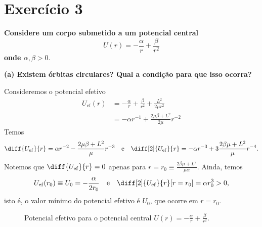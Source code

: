 \section*{Exercício 3}
\textbf{Considere um corpo submetido a um potencial central
    \begin{equation*}
        U(r) = -\frac{\alpha}{r} + \frac{\beta}{r^2}
    \end{equation*}
onde \(\alpha,\beta>0.\)}

\textbf{(a) Existem órbitas circulares? Qual a condição para que isso ocorra?}

Consideremos o potencial efetivo
\begin{align}
    U_\mathrm{ef}(r) &= -\frac{\alpha}{r} + \frac{\beta}{r^2} + \frac{L^2}{2\mu r^2}\\
                     &= -\alpha r^{-1} + \frac{2\mu\beta + L^2}{2\mu}r^{-2}
\end{align}
Temos
\begin{equation}
    \diff{U_\mathrm{ef}}{r} = \alpha r^{-2} - \frac{2\mu\beta + L^2}{\mu}r^{-3}\quad\text{e}\quad\diff[2]{U_\mathrm{ef}}{r} = -\alpha r^{-3} + 3\frac{2\beta\mu + L^2}{\mu}r^{-4}.
\end{equation}
Notemos que \(\diff{U_\mathrm{ef}}{r} = 0\) apenas para \(r = r_0 \equiv \frac{2\beta\mu +L^2}{\mu \alpha}\). Ainda, temos
\begin{equation}
    U_\mathrm{ef}(r_0) \equiv U_0 = -\frac{\alpha}{2r_0}\quad\text{e}\quad\diff[2]{U_\mathrm{ef}}{r}[r=r_0] = \alpha r_0^3 > 0,
\end{equation}
isto é, o valor mínimo do potencial efetivo é \(U_0\), que ocorre em \(r = r_0\).

\begin{figure}[H]
    \centering
    \caption{Potencial efetivo para o potencial central \(U(r) = -\frac{\alpha}{r} + \frac{\beta}{r^2}\).}
\end{figure}

